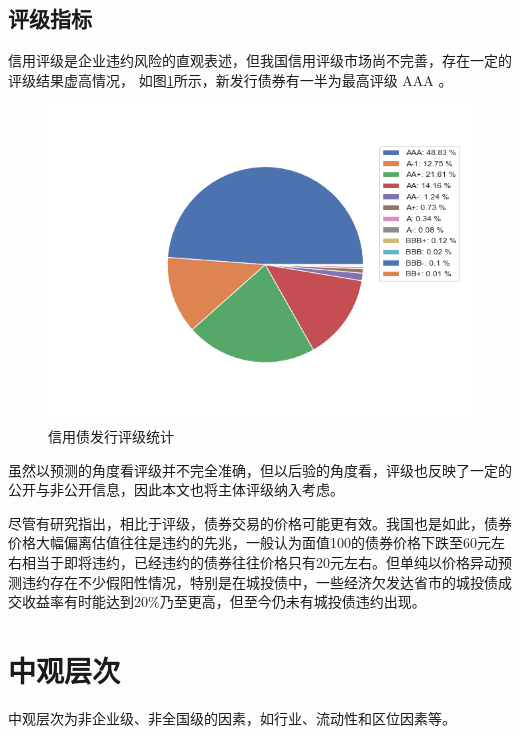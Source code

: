 \subsection{评级指标}
信用评级是企业违约风险的直观表述，但我国信用评级市场尚不完善，存在一定的评级结果虚高情况，
如图\ref{fig:rating}所示，新发行债券有一半为最高评级 AAA 。
\begin{figure}[ht]
	\centering
	\includegraphics[width=0.9\linewidth]{./data/rating_from_2014.png}
	\caption{\label{fig:rating}信用债发行评级统计}
\end{figure}


虽然以预测的角度看评级并不完全准确，但以后验的角度看，评级也反映了一定的公开与非公开信息，因此本文也将主体评级纳入考虑。

尽管有研究指出，相比于评级，债券交易的价格可能更有效\cite{badoer2019relevance}。我国也是如此，债券价格大幅偏离估值往往是违约的先兆，一般认为面值100的债券价格下跌至60元左右相当于即将违约，已经违约的债券往往价格只有20元左右。但单纯以价格异动预测违约存在不少假阳性情况，特别是在城投债中，一些经济欠发达省市的城投债成交收益率有时能达到20\%乃至更高，但至今仍未有城投债违约出现。

\section{中观层次}
中观层次为非企业级、非全国级的因素，如行业、流动性和区位因素等。

